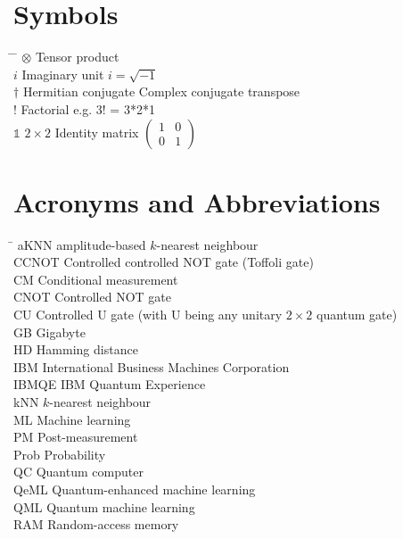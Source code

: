 \section*{Symbols}
\begin{tabbing}
 \hspace*{1.6cm} \= \hspace*{8cm} \= \kill
 $\otimes$ \> Tensor product \\[0.5ex]
 $i$ \> Imaginary unit \> $i=\sqrt{-1}$ \\[0.5ex]
 $\dagger$ \> Hermitian conjugate \> Complex conjugate transpose \\[0.5ex]
 $!$ \> Factorial \> e.g. 3! = 3*2*1 \\[0.5ex]
 $\mathbb{1}$ \> $2\times2$ Identity matrix \> $\begin{pmatrix} 1 & 0 \\ 0 & 1 \end{pmatrix}$ \\[0.5ex]
\end{tabbing}

\section*{Acronyms and Abbreviations}
\begin{tabbing}
 \hspace*{1.6cm}  \= \kill
 aKNN \> amplitude-based $k$-nearest neighbour \\[0.5ex]
 CCNOT \> Controlled controlled NOT gate (Toffoli gate) \\[0.5ex]
 CM \> Conditional measurement \\[0.5ex]
 CNOT \> Controlled NOT gate \\[0.5ex]
 CU \> Controlled U gate (with U being any unitary $2\times2$ quantum gate) \\[0.5ex]
 GB \> Gigabyte \\[0.5ex]
 HD \> Hamming distance \\[0.5ex]
 IBM \> International Business Machines Corporation \\[0.5ex]
 IBMQE \> IBM Quantum Experience \\[0.5ex]
 kNN \> $k$-nearest neighbour \\[0.5ex]
 ML \> Machine learning \\[0.5ex]
 PM \> Post-measurement \\[0.5ex]
 Prob \> Probability \\[0.5ex]
 QC \> Quantum computer \\[0.5ex]
 QeML \> Quantum-enhanced machine learning \\[0.5ex]
 QML \> Quantum machine learning \\[0.5ex]
 RAM \> Random-access memory \\[0.5ex]
 
\end{tabbing}


